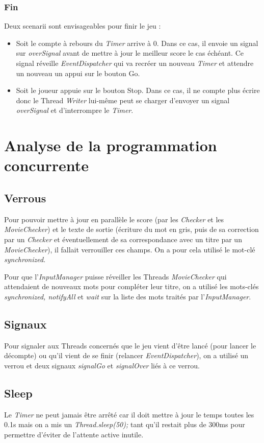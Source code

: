 \documentclass[a4paper,11pt]{article}
\begin{document}
\subsubsection{Fin}
Deux scenarii sont envisageables pour finir le jeu :
\begin{itemize}
\item Soit le compte à rebours du \textit{Timer} arrive à 0. Dans ce cas, il envoie un signal sur \textit{overSignal} avant de mettre à jour le meilleur score le cas échéant. Ce signal réveille \textit{EventDispatcher} qui va recréer un nouveau \textit{Timer} et attendre un nouveau un appui sur le bouton Go.
\item Soit le joueur appuie sur le bouton Stop. Dans ce cas, il ne compte plus écrire donc le Thread \textit{Writer} lui-même peut se charger d'envoyer un signal \textit{overSignal} et d'interrompre le \textit{Timer}.
\end{itemize}
\section{Analyse de la programmation concurrente}
\subsection{Verrous}
Pour pouvoir mettre à jour en parallèle le score (par les \textit{Checker} et les \textit{MovieChecker}) et le texte de sortie (écriture du mot en gris, puis de sa correction par un \textit{Checker} et éventuellement de sa correspondance avec un titre par un \textit{MovieChecker}), il fallait verrouiller ces champs. On a pour cela utilisé le mot-clé \textit{synchronized}.\par
Pour que l'\textit{InputManager} puisse réveiller les Threads \textit{MovieChecker} qui attendaient de nouveaux mots pour compléter leur titre, on a utilisé les mots-clés \textit{synchronized, notifyAll} et \textit{wait} sur la liste des mots traités par l'\textit{InputManager}.
\subsection{Signaux}
Pour signaler aux Threads concernés que le jeu vient d'être lancé (pour lancer le décompte) ou qu'il vient de se finir (relancer \textit{EventDispatcher}), on a utilisé un verrou et deux signaux \textit{signalGo} et \textit{signalOver} liés à ce verrou.
\subsection{Sleep}
Le \textit{Timer} ne peut jamais être arrêté car il doit mettre à jour le temps toutes les 0.1s mais on a mis un \textit{Thread.sleep(50);} tant qu'il restait plus de 300ms pour permettre d'éviter de l'attente active inutile.
\end{document}
